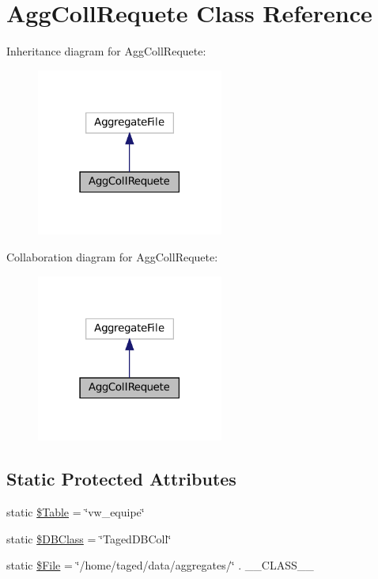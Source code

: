 \hypertarget{class_agg_coll_requete}{}\section{Agg\+Coll\+Requete Class Reference}
\label{class_agg_coll_requete}


Inheritance diagram for Agg\+Coll\+Requete\+:\nopagebreak
\begin{figure}[H]
\begin{center}
\leavevmode
\includegraphics[width=174pt]{class_agg_coll_requete__inherit__graph}
\end{center}
\end{figure}


Collaboration diagram for Agg\+Coll\+Requete\+:\nopagebreak
\begin{figure}[H]
\begin{center}
\leavevmode
\includegraphics[width=174pt]{class_agg_coll_requete__coll__graph}
\end{center}
\end{figure}
\subsection*{Static Protected Attributes}
\begin{DoxyCompactItemize}
\item 
static \hyperlink{class_agg_coll_requete_a471bb2b49ac081035799ea307d068789}{\$\+Table} = \char`\"{}vw\+\_\+equipe\char`\"{}
\item 
static \hyperlink{class_agg_coll_requete_a0d4fed8881a86e520cc80d82dbfc6f7f}{\$\+D\+B\+Class} = \char`\"{}Taged\+D\+B\+Coll\char`\"{}
\item 
static \hyperlink{class_agg_coll_requete_a9e6e7d4439ac16fbb33bf3bfd7e49bbc}{\$\+File} = \char`\"{}/home/taged/data/aggregates/\char`\"{} . \+\_\+\+\_\+\+C\+L\+A\+S\+S\+\_\+\+\_\+
\end{DoxyCompactItemize}


